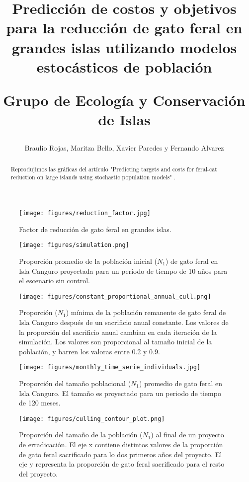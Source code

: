 \documentclass{article} %
\author{Braulio Rojas, Maritza Bello, Xavier Paredes y Fernando Alvarez}
\title{Predicción de costos y objetivos para la reducción de gato feral en grandes islas utilizando
modelos estocásticos de población \\ \begin{large} Grupo de Ecología y Conservación de Islas
\end{large}}
\begin{document}
\maketitle

\begin{abstract}

Reprodujimos las gráficas del artículo "Predicting targets and costs for feral-cat reduction on
large islands using stochastic population models" \cite{venning2021predicting}.

\end{abstract}


\begin{figure}[H]
    \centering
\texttt{[image: figures/reduction\_factor.jpg]}
\caption{Factor de reducción de gato feral en grandes islas.}
\label{fig:reductionFactor}
\end{figure}

\begin{figure}[H]
    \centering
\texttt{[image: figures/simulation.png]}
\caption{Proporción promedio de la población inicial ($N_1$) de gato feral en Isla Canguro
proyectada para un periodo de tiempo de 10 años para el escenario sin control.}
\label{fig:simulation}
\end{figure}

\begin{figure}[H]
    \centering
\texttt{[image: figures/constant\_proportional\_annual\_cull.png]}
\caption{Proporción ($N_1$) mínima de la población remanente de gato feral de Isla Canguro después
	de un sacrificio anual constante. Los valores de la proporción del sacrificio anual cambian en
	cada iteración de la simulación. Los valores son proporcional al tamaño inicial de la población,
	y barren los valoras entre 0.2 y 0.9.}
\label{fig:constantProportionalAnnualCull}
\end{figure}

\begin{figure}[H]
    \centering
\texttt{[image: figures/monthly\_time\_serie\_individuals.jpg]}
\caption{Proporción del tamaño poblacional ($N_1$) promedio de gato feral en Isla Canguro. El tamaño
es proyectado para un periodo de tiempo de 120 meses.}
\label{fig:monthlyTimeSerieIndividuals}
\end{figure}

\begin{figure}[H]
\centering
\texttt{[image: figures/culling\_contour\_plot.png]}
\caption{Proporción del tamaño de la población ($N_1$) al final de un proyecto de erradicación. El
eje x contiene distintos valores de la proporción de gato feral sacrificado para lo dos primeros
años del proyecto. El eje y representa la proporción de gato feral sacrificado para el resto del
proyecto.}
\label{fig:culling_contour_plot}
\end{figure}
\end{document}
